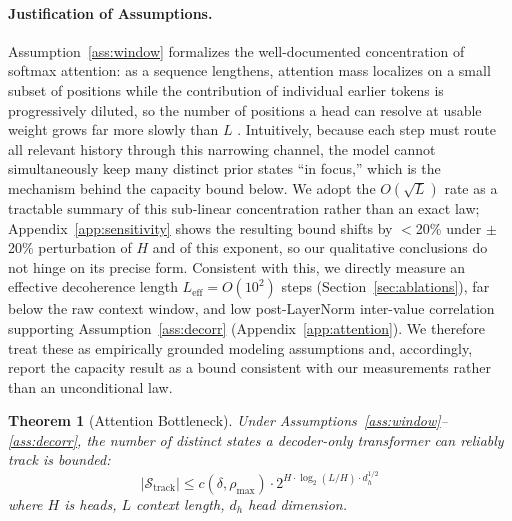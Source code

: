 \documentclass{article}
\theoremstyle{plain}
\newtheorem{theorem}{Theorem}[section]
\theoremstyle{definition}
\theoremstyle{remark}
\newcommand{\Leff}{L_{\mathrm{eff}}}
\begin{document}
\paragraph{Justification of Assumptions.} Assumption~\ref{ass:window} formalizes the well-documented concentration of softmax attention: as a sequence lengthens, attention mass localizes on a small subset of positions while the contribution of individual earlier tokens is progressively diluted, so the number of positions a head can resolve at usable weight grows far more slowly than $L$ \citep{barbero2024oversquash,gerasimov2025fullyutilizetransformersrepresentation}. Intuitively, because each step must route all relevant history through this narrowing channel, the model cannot simultaneously keep many distinct prior states ``in focus,'' which is the mechanism behind the capacity bound below. We adopt the $O(\sqrt{L})$ rate as a tractable summary of this sub-linear concentration rather than an exact law; Appendix~\ref{app:sensitivity} shows the resulting bound shifts by $<$20\% under $\pm$20\% perturbation of $H$ and of this exponent, so our qualitative conclusions do not hinge on its precise form. Consistent with this, we directly measure an effective decoherence length $\Leff=O(10^2)$ steps (Section~\ref{sec:ablations}), far below the raw context window, and low post-LayerNorm inter-value correlation supporting Assumption~\ref{ass:decorr} (Appendix~\ref{app:attention}). We therefore treat these as empirically grounded modeling assumptions and, accordingly, report the capacity result as a bound consistent with our measurements rather than an unconditional law.

\begin{theorem}[Attention Bottleneck]
\label{thm:bottleneck}
Under Assumptions~\ref{ass:window}--\ref{ass:decorr}, the number of distinct states a decoder-only transformer can reliably track is bounded:
\begin{equation}
|\mathcal{S}_{\text{track}}| \leq c(\delta, \rho_{\max}) \cdot 2^{H \cdot \log_2(L/H) \cdot d_h^{1/2}}
\end{equation}
where $H$ is heads, $L$ context length, $d_h$ head dimension.
\end{theorem}
\end{document}
